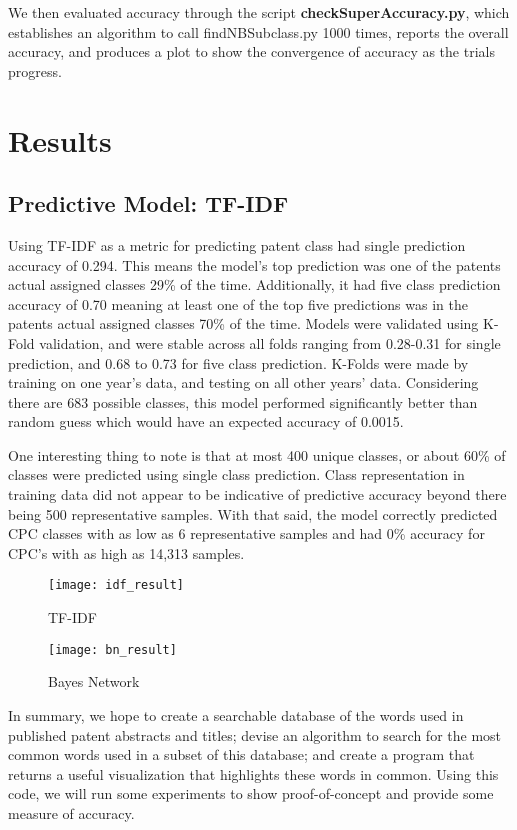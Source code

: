 \documentclass{article}
\begin{document}
We then evaluated accuracy through the script \textbf{checkSuperAccuracy.py}, which establishes an algorithm to call findNBSubclass.py 1000 times, reports the overall accuracy, and produces a plot to show the convergence of accuracy as the trials progress.

\section{Results}
\subsection{Predictive Model: TF-IDF}
Using TF-IDF as a metric for predicting patent class had single prediction accuracy of 0.294. This means the model’s top prediction was one of the patents actual assigned classes 29\% of the time. Additionally, it had five class prediction accuracy of 0.70 meaning at least one of the top five predictions was in the patents actual assigned classes 70\% of the time. Models were validated using K-Fold validation, and were stable across all folds ranging from 0.28-0.31 for single prediction, and 0.68 to 0.73 for five class prediction. K-Folds were made by training on one year's data, and testing on all other years' data. Considering there are 683 possible classes, this model performed significantly better than random guess which would have an expected accuracy of 0.0015. 

	One interesting thing to note is that at most 400 unique classes, or about 60\% of classes were predicted using single class prediction. Class representation in training data did not appear to be indicative of predictive accuracy beyond there being 500 representative samples. With that said, the model correctly predicted CPC classes with as low as 6 representative samples and had 0\% accuracy for CPC’s with as high as 14,313 samples.

\begin{figure}[H]
\texttt{[image: idf\_result]}
\centering
\caption{TF-IDF}
\label{fig:idf_result}
\end{figure}

\begin{figure}[H]
\texttt{[image: bn\_result]}
\centering
\caption{Bayes Network}
\label{fig:bn_result}
\end{figure}

In summary, we hope to create a searchable database of the words used in published patent abstracts and titles; devise an algorithm to search for the most common words used in a subset of this database; and create a program that returns a useful visualization that highlights these words in common. Using this code, we will run some experiments to show proof-of-concept and provide some measure of accuracy.
\end{document}
